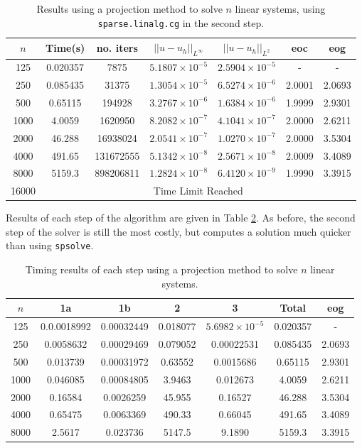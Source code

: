 \documentclass[11pt]{article}
\numberwithin{equation}{section}
\begin{document}
\begin{table}[H]
\centering
\begin{tabular}{|c|c|c|c|c|c|c|}
\hline
$n$ & Time(s) & no. iters & $|| u - u_h ||_{L^{\infty}}$ &$|| u - u_h ||_{L^{2}}$ & eoc & eog \\
\hline
125 & 0.020357 & 7875 & $5.1807 \times 10^{-5}$ & $2.5904 \times 10^{-5}$ & - & - \\
250 & 0.085435 & 31375 & $1.3054 \times 10^{-5}$ & $6.5274 \times 10^{-6}$ & 2.0001  & 2.0693 \\
500 & 0.65115 & 194928 & $3.2767 \times 10^{-6}$ & $1.6384 \times 10^{-6}$ & 1.9999  & 2.9301 \\
1000 & 4.0059 & 1620950 & $8.2082 \times 10^{-7}$ & $4.1041 \times 10^{-7}$ & 2.0000 & 2.6211 \\
2000 & 46.288 & 16938024 & $2.0541 \times 10^{-7}$ & $1.0270 \times 10^{-7}$ & 2.0000 & 3.5304 \\
4000 & 491.65 & 131672555 & $5.1342 \times 10^{-8}$ & $2.5671 \times 10^{-8}$ & 2.0009 &  3.4089 \\
8000 & 5159.3 & 898206811 & $1.2824 \times 10^{-8}$ & $6.4120 \times 10^{-9}$ & 1.9990 & 3.3915 \\
\cline{2-7} 
16000 & \multicolumn{6}{c|}{Time Limit Reached} \\
\hline
\end{tabular}
\captionsetup{justification=centering}
\caption{Results using a projection method to solve $n$ linear systems, using \texttt{sparse.linalg.cg} in the second step.}
\label{table:shifted it}
\end{table}

Results of each step of the algorithm are given in Table \ref{table:shifted it steps}. As before, the second step of the solver is still the most costly, but computes a solution much quicker than using \texttt{spsolve}.

\begin{table}[H]
\centering
\begin{tabular}{|c|c|c|c|c|c|c|}
\hline
$n$ & 1a & 1b & 2 & 3 & Total & eog \\
\hline
125 & 0.0.0018992 & 0.00032449 & 0.018077 & $5.6982 \times 10^{-5}$ & 0.020357 & - \\
250 & 0.0058632 & 0.00029469 & 0.079052 & 0.00022531 & 0.085435 & 2.0693 \\
500 & 0.013739 & 0.00031972 & 0.63552 & 0.0015686 & 0.65115 & 2.9301 \\
1000 & 0.046085 & 0.00084805 & 3.9463 & 0.012673 & 4.0059 & 2.6211 \\
2000 & 0.16584 & 0.0026259 & 45.955 & 0.16527 & 46.288 & 3.5304 \\
4000 & 0.65475 & 0.0063369 & 490.33 & 0.66045 & 491.65 & 3.4089 \\
8000 & 2.5617 & 0.023736 & 5147.5 & 9.1890 & 5159.3 & 3.3915 \\
\hline
\end{tabular}
\captionsetup{justification=centering}
\caption{Timing results of each step using a projection method to solve $n$ linear systems.}
\label{table:shifted it steps}
\end{table}
\end{document}
